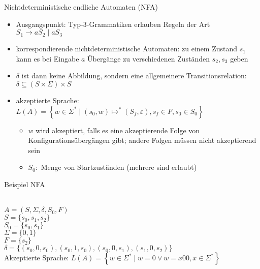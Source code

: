 \begin{frame}{Nichtdeterministische endliche Automaten (NFA)}
	\begin{itemize}
		\item Ausgangspunkt: Typ-3-Grammatiken erlauben Regeln der Art\\
		\quad $S_1 \rightarrow aS_2 \mid aS_3$
		\item korrespondierende nichtdeterministische Automaten: zu
		einem Zustand $s_1$ kann es bei Eingabe $a$ Übergänge zu
		verschiedenen Zuständen $s_2, s_3$ geben
		\item $\delta$ ist dann keine Abbildung, sondern eine allgemeinere Transitionsrelation:\\
		\quad $\delta \subseteq (S \times \Sigma) \times S$
		\item akzeptierte Sprache:\\
		\quad $L(A)=\left\{w \in \Sigma^* \mid (s_0,w) \mapsto^* (S_f, \varepsilon), s_f \in F, s_0 \in S_0 \right\}$
		\begin{itemize}
			\item $w$ wird akzeptiert, falls es eine akzeptierende Folge von Konfigurationsübergängen gibt; andere Folgen müssen nicht akzeptierend sein
			\item $S_0:$ Menge von Startzuständen (mehrere sind erlaubt)
		\end{itemize}
	\end{itemize}
\end{frame}

\begin{frame}{Beispiel NFA}
	\label{NFA_Beispiel}
	\\
	$A=(S, \Sigma, \delta, S_0, F)$\\
	$S=\{s_0, s_1, s_2\}$ \\
	$S_0=\{s_0, s_1\}$\\
	$\Sigma=\{0,1\}$\\
	$F=\{s_2\}$ \\
	$\delta=\{(s_0,0,s_0), (s_0, 1, s_0), (s_0, 0, s_1), (s_1, 0, s_2)\}$\\ 
	Akzeptierte Sprache: $L(A)=\left\{w \in \Sigma^* \mid w=0 \lor w=x00, x\in \Sigma^*\right\}$
\end{frame}

